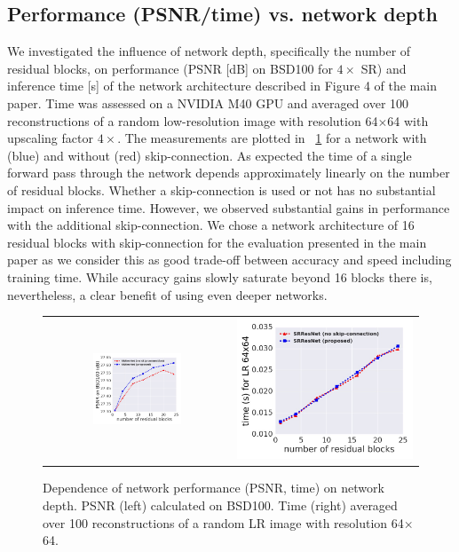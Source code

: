 \documentclass[10pt,twocolumn,letterpaper]{article}
\begin{document}
\subsection{Performance (PSNR/time) vs. network depth}
\label{app:performance}
We investigated the influence of network depth, specifically the number of residual blocks, on performance (PSNR [dB] on BSD100 for $4\times$ SR) and inference time [s] of the network architecture described in Figure 4 of the main paper. Time was assessed on a NVIDIA M40 GPU and averaged over 100 reconstructions of a random low-resolution image with resolution 64$\times$64 with upscaling factor $4\times$. The measurements are plotted in \figurename~\ref{fig:app_psnrtime} for a network with (blue) and without (red) skip-connection.
As expected the time of a single forward pass through the network depends approximately linearly on the number of residual blocks. Whether a skip-connection is used or not has no substantial impact on inference time. However, we observed substantial gains in performance with the additional skip-connection. We chose a network architecture of 16 residual blocks with skip-connection for the evaluation presented in the main paper as we consider this as good trade-off between accuracy and speed including training time. While accuracy gains slowly saturate beyond 16 blocks there is, nevertheless, a clear benefit of using even deeper networks.

\begin{figure}[ht!]
\begin{tabular}{cc}
\includegraphics[width=0.5\textwidth]{images/used/appendix/jpg/psnr_vs_depth} &
\includegraphics[width=0.5 \textwidth]{images/used/appendix/jpg/time_vs_depth}\\
\end{tabular}
\caption{Dependence of network performance (PSNR, time) on network depth. PSNR (left) calculated on BSD100. Time (right) averaged over 100 reconstructions of a random LR image with resolution 64$\times$64.}
\label{fig:app_psnrtime}
\end{figure}
\end{document}

